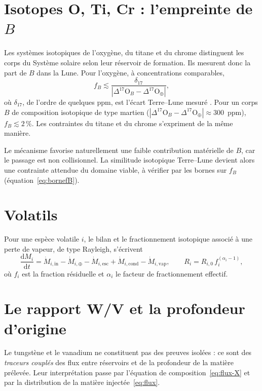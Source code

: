 \documentclass[11pt,a4paper,openany]{report}
\newcommand{\dd}{\mathrm{d}}
\begin{document}
\section{Isotopes O, Ti, Cr : l'empreinte de \texorpdfstring{$B$}{B}}
\label{sec:bornes}

Les systèmes isotopiques de l'oxygène, du titane et du chrome distinguent les corps du Système
solaire selon leur réservoir de formation. Ils mesurent donc la part de $B$ dans la Lune. Pour
l'oxygène, à concentrations comparables,
\begin{equation}
f_B\lesssim\frac{\delta_{17}}{|\Delta^{17}\mathrm{O}_B-\Delta^{17}\mathrm{O}_\oplus|},
\label{eq:bornefB}
\end{equation}
où $\delta_{17}$, de l'ordre de quelques ppm, est l'écart Terre--Lune mesuré \cite{Young2016}. Pour un
corps $B$ de composition isotopique de type martien
($|\Delta^{17}\mathrm{O}_B-\Delta^{17}\mathrm{O}_\oplus|\approx300$~ppm), $f_B\lesssim2\,\%$. Les
contraintes du titane \cite{Zhang2012} et du chrome s'expriment de la même manière.

\begin{apport}
Le mécanisme favorise naturellement une faible contribution matérielle de $B$, car le passage est
non collisionnel. La similitude isotopique Terre--Lune devient alors une contrainte attendue du
domaine viable, à vérifier par les bornes sur $f_B$ (équation~\eqref{eq:bornefB}).
\end{apport}

\section{Volatils}

Pour une espèce volatile $i$, le bilan et le fractionnement isotopique associé à une perte de
vapeur, de type Rayleigh, s'écrivent
\begin{equation}
\frac{\dd M_i}{\dd t}=\dot M_{i,\mathrm{in}}-\dot M_{i,\oplus}-\dot M_{i,\mathrm{esc}}
+\dot M_{i,\mathrm{cond}}-\dot M_{i,\mathrm{vap}},
\qquad
R_i=R_{i,0}\,f_i^{(\alpha_i-1)},
\label{eq:volatils}
\end{equation}
où $f_i$ est la fraction résiduelle et $\alpha_i$ le facteur de fractionnement effectif.


\section{Le rapport W/V et la profondeur d'origine}

Le tungstène et le vanadium ne constituent pas des preuves isolées : ce sont des \emph{traceurs
couplés} des flux entre réservoirs et de la profondeur de la matière prélevée. Leur interprétation
passe par l'équation de composition~\eqref{eq:flux-X} et par la distribution de la matière
injectée~\eqref{eq:flux}.
\end{document}

